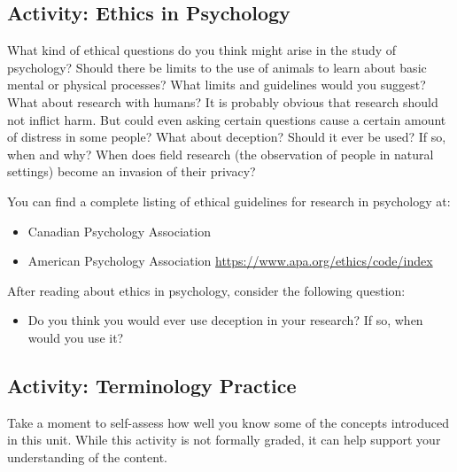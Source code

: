 \documentclass[
]{book}
\providecommand{\tightlist}{%
  \setlength{\itemsep}{0pt}\setlength{\parskip}{0pt}}
\begin{document}
\hypertarget{activity-ethics-in-psychology}{%
\subsection*{Activity: Ethics in Psychology}\label{activity-ethics-in-psychology}}

\begin{reflect}
What kind of ethical questions do you think might arise in the study of psychology? Should there be limits to the use of animals to learn about basic mental or physical processes? What limits and guidelines would you suggest?
What about research with humans? It is probably obvious that research should not inflict harm. But could even asking certain questions cause a certain amount of distress in some people? What about deception? Should it ever be used? If so, when and why? When does field research (the observation of people in natural settings) become an invasion of their privacy?

You can find a complete listing of ethical guidelines for research in psychology at:

\begin{itemize}
\tightlist
\item
  Canadian Psychology Association\\
\item
  American Psychology Association {\url{https://www.apa.org/ethics/code/index}}
\end{itemize}

After reading about ethics in psychology, consider the following question:

\begin{itemize}
\tightlist
\item
  Do you think you would ever use deception in your research? If so, when would you use it?
\end{itemize}
\end{reflect}

\hypertarget{activity-terminology-practice}{%
\subsection*{Activity: Terminology Practice}\label{activity-terminology-practice}}

\begin{reflect}
Take a moment to self-assess how well you know some of the concepts introduced in this unit. While this activity is not formally graded, it can help support your understanding of the content.
\end{reflect}
\end{document}
